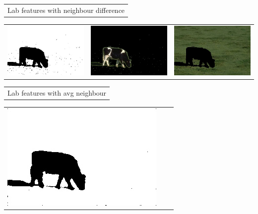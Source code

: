\documentclass{article}
\begin{document}
\begin{center}
\begin{tabular}{c c c}
 \end{tabular}
 \begin{tabular}{c}

Lab features with neighbour difference \\
\end{tabular}
 \begin{tabular}{c c c} 

 \includegraphics[width=.4\linewidth]{../image-segmentation/output/add-Lab-neighbor-diff-feature/cow_mask.jpg} & 
 
 \includegraphics[width=.4\linewidth]{../image-segmentation/output/add-Lab-neighbor-diff-feature/cow_seg1.jpg} & \includegraphics[width=.4\linewidth]{../image-segmentation/output/add-Lab-neighbor-diff-feature/cow_seg2.jpg} \\
  
 \end{tabular}
 \begin{tabular}{c}

Lab features with avg neighbour \\
\end{tabular}
 \begin{tabular}{c c c} 

 \includegraphics[width=.4\linewidth]{../image-segmentation/output/add-Lab-neighbor-avg-feature/cow_mask.jpg} & 
 

\end{tabular}
\end{center}
\end{document}

